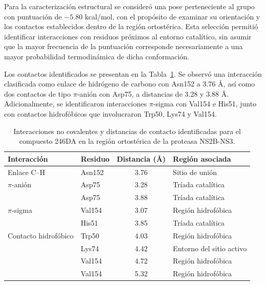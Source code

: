 Para la caracterización estructural se consideró una pose perteneciente al grupo con puntuación de $-5.80$ kcal/mol, con el propósito de examinar su orientación y los contactos establecidos dentro de la región ortostérica. Esta selección permitió identificar interacciones con residuos próximos al entorno catalítico, sin asumir que la mayor frecuencia de la puntuación corresponde necesariamente a una mayor probabilidad termodinámica de dicha conformación.

Los contactos identificados se presentan en la Tabla~\ref{tab:interacciones-pose83}. Se observó una interacción clasificada como enlace de hidrógeno de carbono con Asn152 a 3.76 \AA, así como dos contactos de tipo $\pi$-anión con Asp75, a distancias de 3.28 y 3.88 \AA. Adicionalmente, se identificaron interacciones $\pi$-sigma con Val154 e His51, junto con contactos hidrofóbicos que involucraron Trp50, Lys74 y Val154.

\begin{table}[H]
    \centering
    \caption{Interacciones no covalentes y distancias de contacto identificadas para el compuesto 246DA en la región ortostérica de la proteasa NS2B-NS3.}
    \label{tab:interacciones-pose83}
    \footnotesize
    \renewcommand{\arraystretch}{1.15}
    \begin{tabular}{llcl}
        \toprule
        Interacción & Residuo & Distancia (\AA) & Región asociada \\
        \midrule
        Enlace C--H & Asn152 & 3.76 & Sitio de unión \\
        \midrule
        $\pi$-anión & Asp75 & 3.28 & Tríada catalítica \\
                    & Asp75 & 3.88 & Tríada catalítica \\
        \midrule
        $\pi$-sigma & Val154 & 3.07 & Región hidrofóbica \\
                    & His51  & 3.85 & Tríada catalítica \\
        \midrule
        Contacto hidrofóbico & Trp50  & 4.03 & Región hidrofóbica \\
                            & Lys74  & 4.42 & Entorno del sitio activo \\
                            & Val154 & 4.72 & Región hidrofóbica \\
                            & Val154 & 5.32 & Región hidrofóbica \\
        \bottomrule
    \end{tabular}
\end{table}

